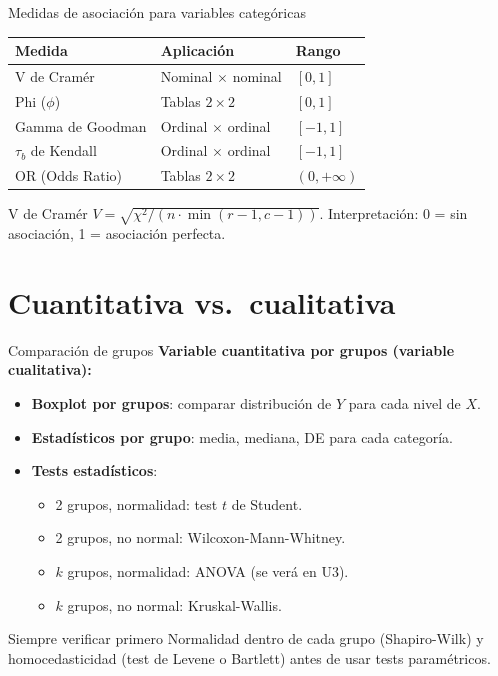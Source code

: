 \documentclass[aspectratio=169]{beamer}
\begin{document}
\begin{frame}{Medidas de asociación para variables categóricas}
  \begin{center}
    \begin{tabular}{lll}
      \toprule
      \textbf{Medida} & \textbf{Aplicación} & \textbf{Rango} \\
      \midrule
      V de Cramér & Nominal $\times$ nominal & $[0, 1]$ \\
      Phi ($\phi$) & Tablas $2\times2$ & $[0, 1]$ \\
      Gamma de Goodman & Ordinal $\times$ ordinal & $[-1, 1]$ \\
      $\tau_b$ de Kendall & Ordinal $\times$ ordinal & $[-1, 1]$ \\
      OR (Odds Ratio) & Tablas $2\times 2$ & $(0, +\infty)$ \\
      \bottomrule
    \end{tabular}
  \end{center}
  \bigskip
  \begin{exampleblock}{V de Cramér}
    $V = \sqrt{\chi^2 / (n \cdot \min(r-1, c-1))}$. Interpretación: 0 = sin asociación, 1 = asociación perfecta.
  \end{exampleblock}
\end{frame}

\section{Cuantitativa vs.\ cualitativa}

\begin{frame}{Comparación de grupos}
  \textbf{Variable cuantitativa por grupos (variable cualitativa):}
  \bigskip
  \begin{itemize}
    \item \textbf{Boxplot por grupos}: comparar distribución de $Y$ para cada nivel de $X$.
    \item \textbf{Estadísticos por grupo}: media, mediana, DE para cada categoría.
    \item \textbf{Tests estadísticos}:
      \begin{itemize}
        \item 2 grupos, normalidad: test $t$ de Student.
        \item 2 grupos, no normal: Wilcoxon-Mann-Whitney.
        \item $k$ grupos, normalidad: ANOVA (se verá en U3).
        \item $k$ grupos, no normal: Kruskal-Wallis.
      \end{itemize}
  \end{itemize}
  \bigskip
  \begin{alertblock}{Siempre verificar primero}
    Normalidad dentro de cada grupo (Shapiro-Wilk) y homocedasticidad (test de Levene o Bartlett) antes de usar tests paramétricos.
  \end{alertblock}
\end{frame}
\end{document}
